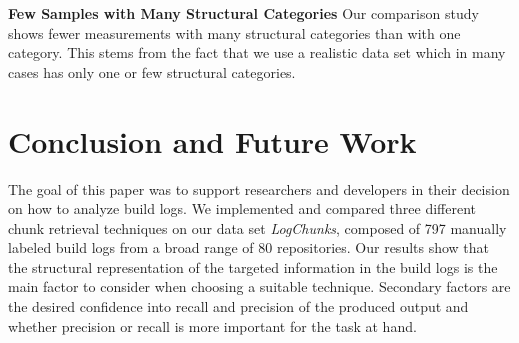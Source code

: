 \noindent
\textbf{Few Samples with Many Structural Categories}
Our comparison study shows fewer measurements with many structural categories than with one category.
This stems from the fact that we use a realistic data set which in many cases has only one or few structural categories.

\section{Conclusion and Future Work}
\label{sec:conclusion-fw}
The goal of this paper was to support researchers and developers in their decision on how to analyze build logs.
We implemented and compared three different chunk retrieval techniques on our data set \emph{LogChunks}, composed of 797 manually labeled build logs from a broad range of 80 repositories.
Our results show that the structural representation of the targeted information in the build logs is the main factor to consider when choosing a suitable technique.
Secondary factors are the desired confidence into recall and precision of the produced output and whether precision or recall is more important for the task at hand.

